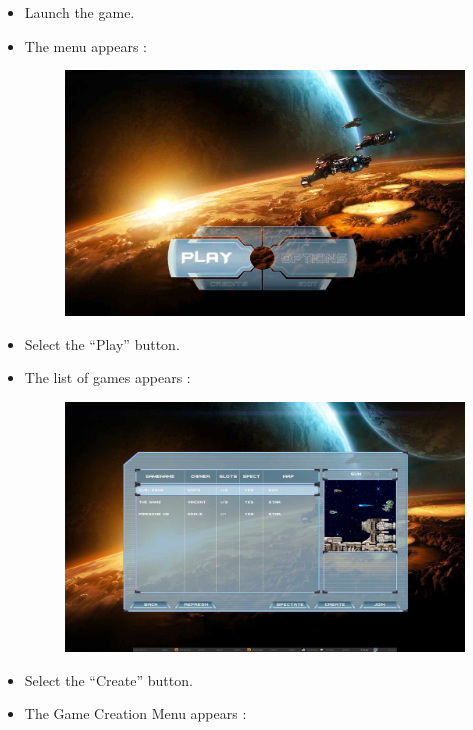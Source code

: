 \documentclass{koala-fr}
\begin{document}
\begin{itemize}
  \item Launch the game.
  \item The menu appears :
\begin{figure}[H]
      \begin{center}
        \includegraphics[width=15cm]{menu.jpg}
      \end{center}
    \end{figure}    
  \item Select the ``Play'' button.
  \item The list of games appears :
\begin{figure}[H]
      \begin{center}
        \includegraphics[width=15cm]{list.jpg}
      \end{center}
    \end{figure}
  \item Select the ``Create'' button.
  \item The Game Creation Menu appears :

\end{itemize}
\end{document}
